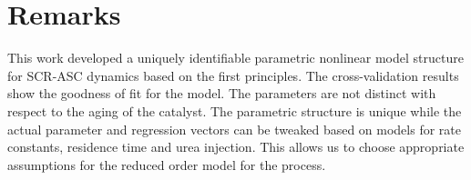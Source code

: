 \section{Remarks}
This work developed a uniquely identifiable parametric nonlinear model structure for SCR-ASC dynamics based on the first principles. The cross-validation results show the goodness of fit for the model. The parameters are not distinct with respect to the aging of the catalyst. The parametric structure is unique while the actual parameter and regression vectors can be tweaked based on models for rate constants, residence time and urea injection. This allows us to choose appropriate assumptions for the reduced order model for the process.
